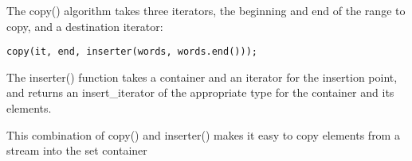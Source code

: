 The copy() algorithm takes three iterators, the beginning and end of the range to copy, and a destination iterator:

\begin{lstlisting}[style=styleCXX]
copy(it, end, inserter(words, words.end()));
\end{lstlisting}

The inserter() function takes a container and an iterator for the insertion point, and returns an insert\_iterator of the appropriate type for the container and its elements.

This combination of copy() and inserter() makes it easy to copy elements from a stream into the set container

